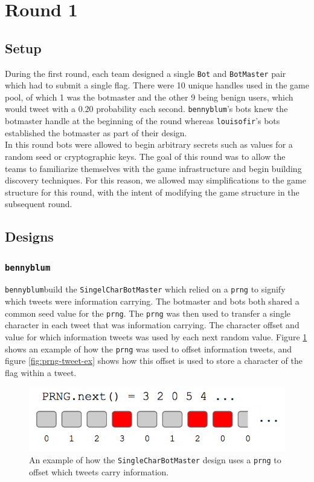 \documentclass[11pt, oneside]{article} %
\numberwithin{equation}{section} %
\numberwithin{figure}{section} %
\numberwithin{table}{section} %
\renewcommand{\c}[1]{\texttt{#1}}
\newcommand{\teambb}{\c{bennyblum}}
\newcommand{\teamol}{\c{louisofir}}
\begin{document}
\section{Round 1}
	\subsection{Setup}
		During the first round, each team designed a single \c{Bot} and \c{BotMaster} pair which had to submit a single flag. There were 10 unique handles used in the game pool, of which 1 was the botmaster and the other 9 being benign users, which would tweet with a $0.20$ probability each second. \teambb's bots knew the botmaster handle at the beginning of the round whereas \teamol's bots established the botmaster as part of their design. \\

		In this round bots were allowed to begin arbitrary secrets such as values for a random seed or cryptographic keys. The goal of this round was to allow the teams to familiarize themselves with the game infrastructure and begin building discovery techniques. For this reason, we allowed may simplifications to the game structure for this round, with the intent of modifying the game structure in the subsequent round. 

	\subsection{Designs}
		\subsubsection{\teambb}
			\teambb build the \c{SingelCharBotMaster} which relied on a \c{prng} to signify which tweets were information carrying. The botmaster and bots both shared a common seed value for the \c{prng}. The \c{prng} was then used to transfer a single character in each tweet that was information carrying. The character offset and value for which information tweets was used by each next random value. Figure \ref{fig:prng} shows an example of how the \c{prng} was used to offset information tweets, and figure \ref{fig:prng-tweet-ex} shows how this offset is used to store a character of the flag within a tweet. \\

		\begin{figure}[H]
		    \center\includegraphics[scale=0.70]{resources/prng.png}
		    \caption{An example of how the \c{SingleCharBotMaster} design uses a \c{prng} to offset which tweets carry information.}
		    \label{fig:prng}
		 \end{figure}
\end{document}
